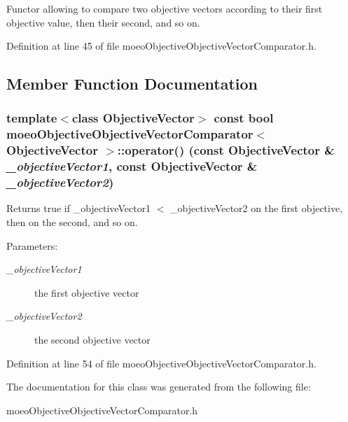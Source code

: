 Functor allowing to compare two objective vectors according to their first objective value, then their second, and so on. 



Definition at line 45 of file moeo\-Objective\-Objective\-Vector\-Comparator.h.

\subsection{Member Function Documentation}
\subsubsection{\setlength{\rightskip}{0pt plus 5cm}template$<$class Objective\-Vector$>$ const bool \bf{moeo\-Objective\-Objective\-Vector\-Comparator}$<$ Objective\-Vector $>$::operator() (const Objective\-Vector \& {\em \_\-objective\-Vector1}, const Objective\-Vector \& {\em \_\-objective\-Vector2})\hspace{0.3cm}{\tt  [inline]}}\label{classmoeoObjectiveObjectiveVectorComparator_bc3c97b380e87107e92f52843a7f9303}


Returns true if \_\-objective\-Vector1 $<$ \_\-objective\-Vector2 on the first objective, then on the second, and so on. 

\begin{Desc}
\item[Parameters:]
\begin{description}
\item[{\em \_\-objective\-Vector1}]the first objective vector \item[{\em \_\-objective\-Vector2}]the second objective vector \end{description}
\end{Desc}


Definition at line 54 of file moeo\-Objective\-Objective\-Vector\-Comparator.h.

The documentation for this class was generated from the following file:\begin{CompactItemize}
\item 
moeo\-Objective\-Objective\-Vector\-Comparator.h\end{CompactItemize}
